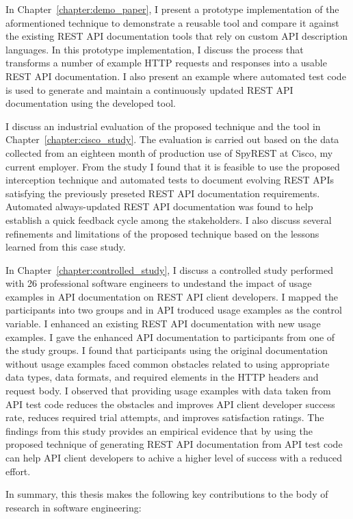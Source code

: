 In Chapter~\ref{chapter:demo_paper}, I present a prototype implementation of the aformentioned technique to demonstrate a reusable tool and compare it against the existing REST API documentation tools that rely on custom API description languages. In this prototype implementation, I discuss the process that transforms a number of example HTTP requests and responses into a usable REST API documentation. I also present an example where automated test code is used to generate and maintain a continuously updated REST API documentation using the developed tool.

I discuss an industrial evaluation of the proposed technique and the tool in Chapter~\ref{chapter:cisco_study}. The evaluation is carried out based on the data collected from an eighteen month of production use of SpyREST at Cisco, my current employer. From the study I found that it is feasible to use the proposed interception technique and automated tests to document evolving REST APIs satisfying the previously preseted REST API documentation requirements. Automated always-updated REST API documentation was found to help establish a quick feedback cycle among the stakeholders. I also discuss several refinements and limitations of the proposed technique based on the lessons learned from this case study.

In Chapter~\ref{chapter:controlled_study}, I discuss a controlled study performed with 26 professional software engineers to undestand the impact of usage examples in API documentation on REST API client developers. I mapped the participants into two groups and in API troduced usage examples as the control variable. I enhanced an existing REST API documentation with new usage examples. I gave the enhanced API documentation to participants from one of the study groups. I found that participants using the original documentation without usage examples faced common obstacles related to using appropriate data types, data formats, and required elements in the HTTP headers and request body. I observed that providing usage examples with data taken from API test code reduces the obstacles and improves API client developer success rate, reduces required trial attempts, and improves satisfaction ratings. The findings from this study provides an empirical evidence that by using the proposed technique of generating REST API documentation from API test code can help API client developers to achive a higher level of success with a reduced effort.

In summary, this thesis makes the following key contributions to the body of research in software engineering:

